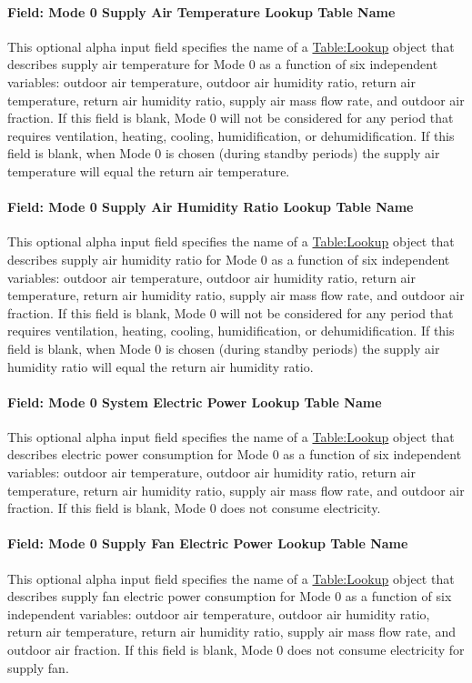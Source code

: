 \paragraph{Field: Mode 0 Supply Air Temperature Lookup Table Name}
This optional alpha input field specifies the name of a \hyperref[tablelookup]{Table:Lookup} object that describes supply air temperature for Mode 0 as a function of six independent variables: outdoor air temperature, outdoor air humidity ratio, return air temperature, return air humidity ratio, supply air mass flow rate, and outdoor air fraction.  If this field is blank, Mode 0 will not be considered for any period that requires ventilation, heating, cooling, humidification, or dehumidification. If this field is blank, when Mode 0 is chosen (during standby periods) the supply air temperature will equal the return air temperature.

\paragraph{Field: Mode 0 Supply Air Humidity Ratio Lookup Table Name}
This optional alpha input field specifies the name of a \hyperref[tablelookup]{Table:Lookup} object that describes supply air humidity ratio for Mode 0 as a function of six independent variables: outdoor air temperature, outdoor air humidity ratio, return air temperature, return air humidity ratio, supply air mass flow rate, and outdoor air fraction. If this field is blank, Mode 0 will not be considered for any period that requires ventilation, heating, cooling, humidification, or dehumidification. If this field is blank, when Mode 0 is chosen (during standby periods) the supply air humidity ratio will equal the return air humidity ratio.

\paragraph{Field: Mode 0 System Electric Power Lookup Table Name}
This optional alpha input field specifies the name of a \hyperref[tablelookup]{Table:Lookup} object that describes electric power consumption for Mode 0 as a function of six independent variables: outdoor air temperature, outdoor air humidity ratio, return air temperature, return air humidity ratio, supply air mass flow rate, and outdoor air fraction. If this field is blank, Mode 0 does not consume electricity.

\paragraph{Field: Mode 0 Supply Fan Electric Power Lookup Table Name}
This optional alpha input field specifies the name of a \hyperref[tablelookup]{Table:Lookup} object that describes supply fan electric power consumption for Mode 0 as a function of six independent variables: outdoor air temperature, outdoor air humidity ratio, return air temperature, return air humidity ratio, supply air mass flow rate, and outdoor air fraction. If this field is blank, Mode 0 does not consume electricity for supply fan.

